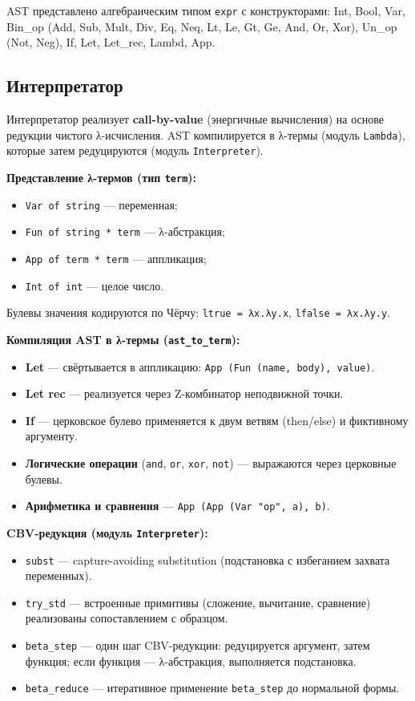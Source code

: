 \documentclass[a4paper]{article}
\begin{document}
AST представлено алгебраическим типом \texttt{expr} с конструкторами: Int, Bool, Var, Bin\_op (Add, Sub, Mult, Div, Eq, Neq, Lt, Le, Gt, Ge, And, Or, Xor), Un\_op (Not, Neg), If, Let, Let\_rec, Lambd, App.

\subsection{Интерпретатор}

Интерпретатор реализует \textbf{call-by-value} (энергичные вычисления) на основе редукции чистого λ-исчисления. AST компилируется в λ-термы (модуль \texttt{Lambda}), которые затем редуцируются (модуль \texttt{Interpreter}).

\textbf{Представление λ-термов (тип \texttt{term}):}
\begin{itemize}
    \item \texttt{Var of string} — переменная;
    \item \texttt{Fun of string * term} — λ-абстракция;
    \item \texttt{App of term * term} — аппликация;
    \item \texttt{Int of int} — целое число.
\end{itemize}

Булевы значения кодируются по Чёрчу: \texttt{ltrue = λx.λy.x}, \texttt{lfalse = λx.λy.y}.

\textbf{Компиляция AST в λ-термы (\texttt{ast\_to\_term}):}
\begin{itemize}
    \item \textbf{Let} — свёртывается в аппликацию: \texttt{App (Fun (name, body), value)}.
    \item \textbf{Let rec} — реализуется через Z-комбинатор неподвижной точки.
    \item \textbf{If} — церковское булево применяется к двум ветвям (then/else) и фиктивному аргументу.
    \item \textbf{Логические операции} (\texttt{and}, \texttt{or}, \texttt{xor}, \texttt{not}) — выражаются через церковные булевы.
    \item \textbf{Арифметика и сравнения} — \texttt{App (App (Var "op", a), b)}.
\end{itemize}

\textbf{CBV-редукция (модуль \texttt{Interpreter}):}
\begin{itemize}
    \item \texttt{subst} — capture-avoiding substitution (подстановка с избеганием захвата переменных).
    \item \texttt{try\_std} — встроенные примитивы (сложение, вычитание, сравнение) реализованы сопоставлением с образцом.
    \item \texttt{beta\_step} — один шаг CBV-редукции: редуцируется аргумент, затем функция; если функция — λ-абстракция, выполняется подстановка.
    \item \texttt{beta\_reduce} — итеративное применение \texttt{beta\_step} до нормальной формы.
\end{itemize}
\end{document}
